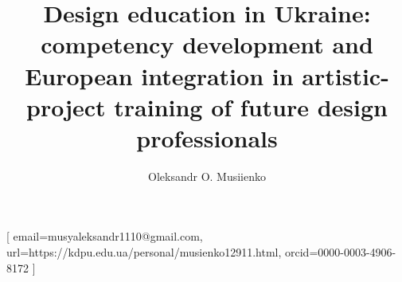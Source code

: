 \documentclass[ed]{acnsart}
\begin{document}
	\title{Design education in Ukraine: competency development and European integration in artistic-project training of future design professionals}
	
	\author{Oleksandr O. Musiienko}[
	email={musyaleksandr1110@gmail.com},
	url={https://kdpu.edu.ua/personal/musienko12911.html},
	orcid={0000-0003-4906-8172}
	] 
	
	\address{Kryvyi Rih State Pedagogical University, 54 Universytetskyi Ave., Kryvyi Rih, 50086, Ukraine}
	
	
	
	
	
\end{document}

